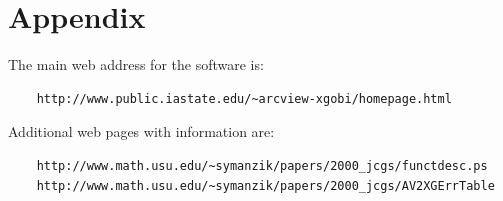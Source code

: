 \section*{Appendix}

The main web address for the software is:
\begin{verbatim}
    http://www.public.iastate.edu/~arcview-xgobi/homepage.html
\end{verbatim}

\noindent
Additional web pages with information are:

\begin{verbatim}
    http://www.math.usu.edu/~symanzik/papers/2000_jcgs/functdesc.ps
    http://www.math.usu.edu/~symanzik/papers/2000_jcgs/AV2XGErrTable
\end{verbatim}







